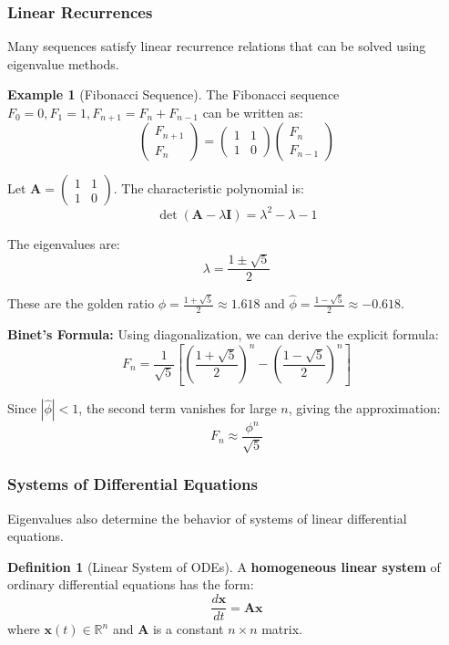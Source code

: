 \documentclass[12pt]{article}
\numberwithin{equation}{section}
\newcommand{\RR}{\mathbb{R}}
\newcommand{\vect}[1]{\boldsymbol{#1}}   %
\newcommand{\mat}[1]{\mathbf{#1}}        %
\theoremstyle{plain}
\theoremstyle{definition}
\newtheorem{definition}[theorem]{Definition}
\newtheorem{example}[theorem]{Example}
\theoremstyle{remark}
\begin{document}
\subsubsection{Linear Recurrences}

Many sequences satisfy linear recurrence relations that can be solved using eigenvalue methods.

\begin{example}[Fibonacci Sequence]
The Fibonacci sequence $F_0 = 0, F_1 = 1, F_{n+1} = F_n + F_{n-1}$ can be written as:
$$\begin{pmatrix} F_{n+1} \\ F_n \end{pmatrix} = \begin{pmatrix} 1 & 1 \\ 1 & 0 \end{pmatrix}\begin{pmatrix} F_n \\ F_{n-1} \end{pmatrix}$$

Let $\mat{A} = \begin{pmatrix} 1 & 1 \\ 1 & 0 \end{pmatrix}$. The characteristic polynomial is:
$$\det(\mat{A} - \lambda\mat{I}) = \lambda^2 - \lambda - 1$$

The eigenvalues are:
$$\lambda = \frac{1 \pm \sqrt{5}}{2}$$

These are the golden ratio $\phi = \frac{1+\sqrt{5}}{2} \approx 1.618$ and $\hat{\phi} = \frac{1-\sqrt{5}}{2} \approx -0.618$.

\textbf{Binet's Formula:} Using diagonalization, we can derive the explicit formula:
$$F_n = \frac{1}{\sqrt{5}}\left[\left(\frac{1+\sqrt{5}}{2}\right)^n - \left(\frac{1-\sqrt{5}}{2}\right)^n\right]$$

Since $|\hat{\phi}| < 1$, the second term vanishes for large $n$, giving the approximation:
$$F_n \approx \frac{\phi^n}{\sqrt{5}}$$
\end{example}

\subsubsection{Systems of Differential Equations}

Eigenvalues also determine the behavior of systems of linear differential equations.

\begin{definition}[Linear System of ODEs]
A \textbf{homogeneous linear system} of ordinary differential equations has the form:
$$\frac{d\vect{x}}{dt} = \mat{A}\vect{x}$$
where $\vect{x}(t) \in \RR^n$ and $\mat{A}$ is a constant $n \times n$ matrix.
\end{definition}
\end{document}
